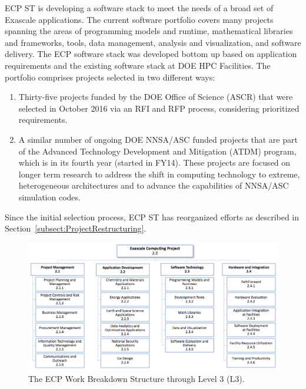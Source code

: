 
ECP ST is developing a software stack to meet the needs of a broad set of Exascale applications. The current software portfolio covers many projects spanning the areas of programming models and runtime, mathematical libraries and frameworks, tools, data management, analysis and visualization, and software delivery. The ECP software stack was developed bottom up based on application requirements and the existing software stack at DOE HPC Facilities. The portfolio comprises projects selected in two different ways: 
\begin{enumerate}
\item Thirty-five projects funded by the DOE Office of Science (ASCR) that were selected in October 2016 via an RFI and RFP process, considering prioritized requirements.
\item A similar number of ongoing DOE NNSA/ASC funded projects that are part of the Advanced Technology Development and Mitigation (ATDM) program, which is in its fourth year (started in FY14). These projects are focused on longer term research to address the shift in computing technology to extreme, heterogeneous architectures and to advance the capabilities of NNSA/ASC simulation codes. 
\end{enumerate}
Since the initial selection process, ECP ST has reorganized efforts as described in Section~\ref{subsect:ProjectRestructuring}.

\begin{figure}
	\centering
	\includegraphics[width=0.9\linewidth]{ECP20}
	\caption{The ECP Work Breakdown Structure through Level 3 (L3).}
	\label{fig:ecp2}
\end{figure}


